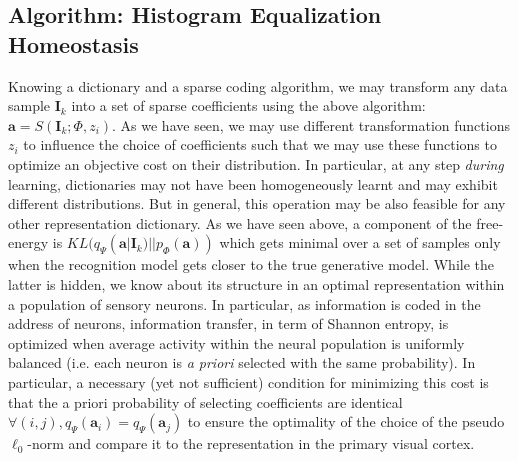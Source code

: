 \documentclass[draft]{article} %
\newcommand{\coef}{\mathbf{a}} %
\newcommand{\image}{\mathbf{I}} %
\newcommand{\dico}{\Phi} %
\begin{document}
\subsection{Algorithm: Histogram Equalization Homeostasis}\label{HEH}
Knowing a dictionary and a sparse coding algorithm, we may transform any data sample $\image_k$ into a set of sparse coefficients using the above algorithm: $\coef = S(\image_k; \dico, z_i)$. As we have seen, we may use different transformation functions $z_i$ to influence the choice of coefficients such that we may use these functions to optimize an objective cost on their distribution.
In particular, at any step \emph{during} learning, dictionaries may not have been homogeneously learnt and may exhibit different distributions. But in general, this operation may be also feasible for any other representation dictionary.
As we have seen above, a component of the free-energy is $KL( q_\Psi(\coef | \image_k) || p_\dico(\coef) )$ which gets minimal over a set of samples only when the recognition model gets closer to the true generative model. While the latter is hidden, we know about its structure in an optimal representation within a population of sensory neurons. In particular, as information is coded in the address of neurons, information transfer, in term of Shannon entropy, is optimized when average activity within the neural population is uniformly balanced (i.e. each neuron is \emph{a priori} selected with the same probability).
In particular, a necessary (yet not sufficient) condition for minimizing this cost is that the a priori probability of selecting coefficients are identical $\forall (i,j), q_\Psi(\coef_i)=q_\Psi(\coef_j)$ to ensure the optimality of the choice of the pseudo $\ell_0$-norm and compare it to the representation in the primary visual cortex.
\end{document}
